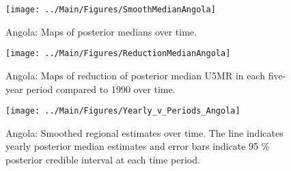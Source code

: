 \documentclass[12pt]{article}\usepackage[]{graphicx}\usepackage[]{color}
\newenvironment{knitrout}{}{} %
\begin{document}
\begin{knitrout}
\color{fgcolor}\begin{figure}[bht]

{\centering \texttt{[image: ../Main/Figures/SmoothMedianAngola]} 

}

\caption[Angola]{Angola: Maps of posterior medians over time.}\label{fig:unnamed-chunk-4}
\end{figure}


\end{knitrout}
\begin{knitrout}
\color{fgcolor}\begin{figure}[bht]

{\centering \texttt{[image: ../Main/Figures/ReductionMedianAngola]} 

}

\caption[Angola]{Angola: Maps of reduction of posterior median U5MR in each five-year period compared to 1990 over time.}\label{fig:unnamed-chunk-5}
\end{figure}


\end{knitrout}
\begin{knitrout}
\color{fgcolor}\begin{figure}[bht]

{\centering \texttt{[image: ../Main/Figures/Yearly\_v\_Periods\_Angola]} 

}

\caption[Angola]{Angola: Smoothed regional estimates over time. The line indicates yearly posterior median estimates and error bars indicate 95 \% posterior credible interval at each time period.}\label{fig:unnamed-chunk-6}
\end{figure}


\end{knitrout}
\end{document}
